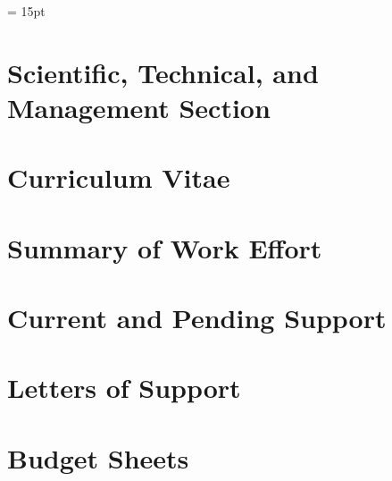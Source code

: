 \documentclass[12pt]{article}
\begin{document}


\setlength{\baselineskip}{1.0\baselineskip} %
\setlength{\parskip}{1.\parskip}

\parindent = 15pt

\tableofcontents

\setcounter{page}{0}
\setcounter{figure}{0}

\newpage

\section{Scientific, Technical, and Management Section}

%

\vspace{-0.15in}
%


\vspace{-0.22in}



\vspace{-0.22in}



\vspace{-0.22in}



\vspace{-0.22in}



\vspace{-0.22in}



\vspace{-0.22in}



\newpage



\newpage

\section{Curriculum Vitae}
\label{sec:cv}

\newpage
\addtocounter{page}{8}
\section{Summary of Work Effort}
\label{sec:workeffort}

\section{Current and Pending Support}
\label{sec:current_and_pending}

\newpage
\addtocounter{page}{13}
\section{Letters of Support}
\label{sec:lettersofsupport}

\newpage
\addtocounter{page}{3}



\newpage

\section{Budget Sheets}


\end{document}
